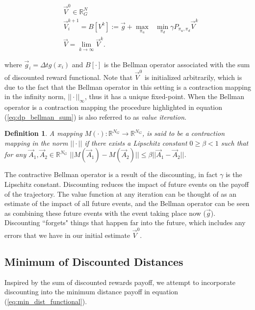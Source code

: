 \documentclass{journal}
\newcommand{\RR}{\mathbb{R}}
\newtheorem{definition}{Definition}
\begin{document}
\begin{subequations}\label{eq:dp_bellman_sum}
\begin{align}
&\vec{V}^{0} \in \RR^N_G\\
&\vec{V}_{i}^{k+1} = B[V^k] := \vec{g} +  \underset{\pi_u}{\max}\text{ }\underset{ \pi_d}{\min} \gamma P_{\pi_u, \pi_d} \vec{V}^k  \\
&\vec{V} = \lim_{k\rightarrow \infty} \vec{V}^{k}.
\end{align}
\end{subequations}

\noindent where $\vec{g}_i =\Delta t g(x_i)$ and $B[\cdot]$ is the Bellman operator associated with the sum of discounted reward functional. Note that $\vec{V}^{0}$ is initialized arbitrarily, which is due to the fact that the Bellman operator in this setting is a contraction mapping in the infinity norm, $||\cdot||_\infty$, thus it has a unique fixed-point. When the Bellman operator is a contraction mapping the procedure highlighted in equation (\ref{eq:dp_bellman_sum}) is also referred to as \emph{value iteration}.

\begin{definition} A mapping $M(\cdot): \RR^{N_G} \rightarrow \RR^{N_G}$, is said to be a contraction mapping in the norm $|| \cdot ||$ if there exists  a Lipschitz constant $0\geq \beta < 1$ such that for any $\vec{A}_1, \vec{A}_2 \in \RR^{N_G}$ $||M(\vec{A}_1) - M(\vec{A}_2)|| \leq \beta ||\vec{A}_1 - \vec{A}_2||$. 
\end{definition}

The contractive Bellman operator is a result of the discounting, in fact $\gamma$ is the Lipschitz constant. Discounting reduces the impact of future events on the payoff of the trajectory. The value function at any iteration can be thought of as an estimate of the impact of all future events, and the Bellman operator can be seen as combining these future events with the event taking place now ($\vec{g}$). Discounting ``forgets" things that happen far into the future, which includes any errors that we have in our initial estimate $\vec{V}^0$.  

\subsection {Minimum of Discounted Distances}
Inspired by the sum of discounted rewards payoff, we attempt to incorporate discounting into the minimum distance payoff in equation (\ref{eq:min_dist_functional}).
\end{document}
